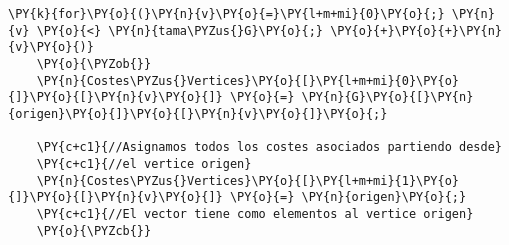 \begin{Verbatim}[commandchars=\\\{\}]
\PY{k}{for}\PY{o}{(}\PY{n}{v}\PY{o}{=}\PY{l+m+mi}{0}\PY{o}{;} \PY{n}{v} \PY{o}{<} \PY{n}{tama\PYZus{}G}\PY{o}{;} \PY{o}{+}\PY{o}{+}\PY{n}{v}\PY{o}{)}
    \PY{o}{\PYZob{}}
	\PY{n}{Costes\PYZus{}Vertices}\PY{o}{[}\PY{l+m+mi}{0}\PY{o}{]}\PY{o}{[}\PY{n}{v}\PY{o}{]} \PY{o}{=} \PY{n}{G}\PY{o}{[}\PY{n}{origen}\PY{o}{]}\PY{o}{[}\PY{n}{v}\PY{o}{]}\PY{o}{;}

	\PY{c+c1}{//Asignamos todos los costes asociados partiendo desde}
	\PY{c+c1}{//el vertice origen}
	\PY{n}{Costes\PYZus{}Vertices}\PY{o}{[}\PY{l+m+mi}{1}\PY{o}{]}\PY{o}{[}\PY{n}{v}\PY{o}{]} \PY{o}{=} \PY{n}{origen}\PY{o}{;}
	\PY{c+c1}{//El vector tiene como elementos al vertice origen}
    \PY{o}{\PYZcb{}}
\end{Verbatim}
